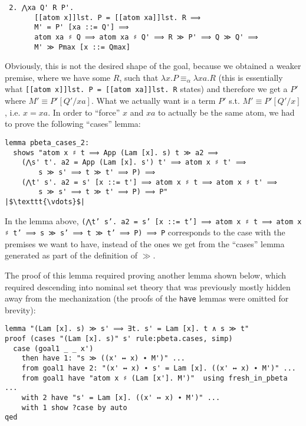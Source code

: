 \documentclass[a4paper, 12pt, twoside]{style/ociamthesis}
\theoremstyle{plain}
\theoremstyle{definition}
\theoremstyle{remark}
\begin{document}
\begin{verbatim}
 2. ⋀xa Q' R P'.
       [[atom x]]lst. P = [[atom xa]]lst. R ⟹
       M' = P' [xa ::= Q'] ⟹
       atom xa ♯ Q ⟹ atom xa ♯ Q' ⟹ R ≫ P' ⟹ Q ≫ Q' ⟹ 
       M' ≫ Pmax [x ::= Qmax]
\end{verbatim}

Obviously, this is not the desired shape of the goal, because we
obtained a weaker premise, where we have some \(R\), such that
\(\lambda x. P \equiv_\alpha \lambda xa. R\) (this is essentially what
\texttt{[[atom x]]lst. P = [[atom xa]]lst. R} states) and therefore we
get a \(P'\) where \(M' \equiv P'[Q'/xa]\). What we actually want is a
term \(P'\) s.t. \(M' \equiv P'[Q'/x]\), i.e. \(x = xa\). In order to
``force'' \(x\) and \(xa\) to actually be the same atom, we had to prove
the following ``cases'' lemma:

\begin{verbatim}
lemma pbeta_cases_2:
  shows "atom x ♯ t ⟹ App (Lam [x]. s) t ≫ a2 ⟹ 
    (⋀s' t'. a2 = App (Lam [x]. s') t' ⟹ atom x ♯ t' ⟹ 
        s ≫ s' ⟹ t ≫ t' ⟹ P) ⟹
    (⋀t' s'. a2 = s' [x ::= t'] ⟹ atom x ♯ t ⟹ atom x ♯ t' ⟹ 
        s ≫ s' ⟹ t ≫ t' ⟹ P) ⟹ P"
|$\texttt{\vdots}$|
\end{verbatim}

In the lemma above,
\texttt{(⋀t' s'. a2 = s' [x ::= t'] ⟹ atom x ♯ t ⟹ atom x ♯ t' ⟹ s ≫ s' ⟹ t ≫ t' ⟹ P) ⟹ P}
corresponds to the case with the premises we want to have, instead of
the ones we get from the ``cases'' lemma generated as part of the
definition of \(\gg\).

The proof of this lemma required proving another lemma shown below,
which required descending into nominal set theory that was previously
mostly hidden away from the mechanization (the proofs of the
\texttt{have} lemmas were omitted for brevity):

\begin{verbatim}
lemma "(Lam [x]. s) ≫ s' ⟹ ∃t. s' = Lam [x]. t ∧ s ≫ t"
proof (cases "(Lam [x]. s)" s' rule:pbeta.cases, simp)
  case (goal1 _ _ x')
    then have 1: "s ≫ ((x' ↔ x) ∙ M')" ...
    from goal1 have 2: "(x' ↔ x) ∙ s' = Lam [x]. ((x' ↔ x) ∙ M')" ...
    from goal1 have "atom x ♯ (Lam [x']. M')"  using fresh_in_pbeta ...
    with 2 have "s' = Lam [x]. ((x' ↔ x) ∙ M')" ...
    with 1 show ?case by auto
qed
\end{verbatim}
\end{document}

